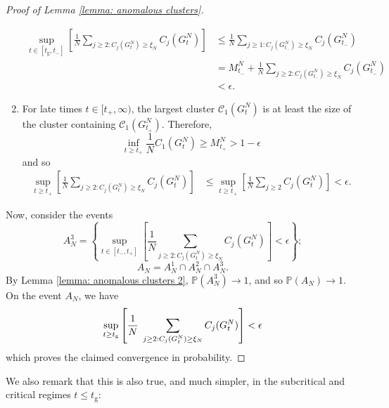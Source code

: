 \begin{proof}[Proof of Lemma \ref{lemma: anomalous clusters}]
\begin{enumerate}[label=\roman{*}).]
    \begin{equation} \begin{split}
        \sup_{t\in [t_\mathrm{g}, t_-]} \left[\frac{1}{N} \sum_{j\geq 2: C_j(G^N_t)\geq \xi_N} C_j(G^N_t)\right] & \leq \frac{1}{N}\sum_{j\geq 1: C_j(G^N_{t_-}) \geq \xi_N} C_j(G^N_{t_-}) \\ & = M^N_{t_-}+\frac{1}{N}\sum_{j\geq 2: C_j(G^N_{t_-}) \geq \xi_N} C_j(G^N_{t_-})\\ & <\epsilon.
   \end{split} \end{equation}
    \item For late times $t\in [t_+, \infty)$, the largest cluster $\mathcal{C}_1(G^N_t)$ is at least the size of the cluster containing $\mathcal{C}_1(G^N_{t_+})$. Therefore, \begin{equation}
        \inf_{t\geq t_+} \frac{1}{N}C_1(G^N_t)\geq M^N_{t_+}>1-\epsilon
    \end{equation} and so 
    \begin{equation}\begin{split}
        \sup_{t\geq t_+} \left[\frac{1}{N} \sum_{j\geq 2: C_j(G^N_t)\geq \xi_N} C_j(G^N_t)\right] & \leq \sup_{t\geq t_+} \left[ \frac{1}{N} \sum_{j\geq 2} C_j(G^N_t)\right]  <\epsilon. \end{split}
    \end{equation}
\end{enumerate}
Now, consider the events
\begin{equation}
    A^3_N=\left\{\sup_{t\in [t_-, t_+]}\left[\frac{1}{N}\sum_{j\geq 2: C_j(G^N_{t})\geq \xi_N} C_j(G^N_{t})\right]<\epsilon \right\};\end{equation}
    \begin{equation}
    A_N=A^1_N\cap A^2_N\cap A^3_N.\end{equation} By Lemma \ref{lemma: anomalous clusters 2}, $\mathbb{P}(A^3_N)\rightarrow 1$, and so $\mathbb{P}(A_N) \rightarrow 1$. On the event $A_N$, we have \begin{equation}
        \sup_{t\geq t_\mathrm{g}}\left[\frac{1}{N}\hspace{0.1cm} \sum_{j\geq 2: C_j(G^N_t)\geq \xi_N} C_j(G^N_t)\right] <\epsilon
    \end{equation} which proves the claimed convergence in probability. 
\end{proof} 
We also remark that this is also true, and much simpler, in the subcritical and critical regimes $t\le t_\mathrm{g}:$ 
